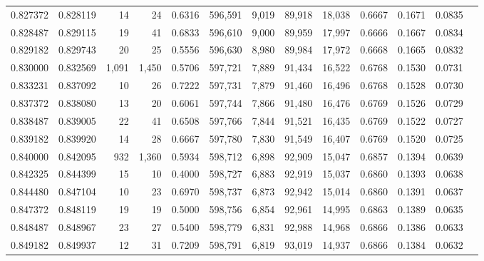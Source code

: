 \begin{tabular}{rrrrrrrrrrrrr}
0.827372 & 0.828119 &     14 &    24 &                                     0.6316 & 596,591 &   9,019 &  89,918 &  18,038 & 0.6667 & 0.1671 & 0.0835 \\
0.828487 & 0.829115 &     19 &    41 &                                     0.6833 & 596,610 &   9,000 &  89,959 &  17,997 & 0.6666 & 0.1667 & 0.0834 \\
0.829182 & 0.829743 &     20 &    25 &                                     0.5556 & 596,630 &   8,980 &  89,984 &  17,972 & 0.6668 & 0.1665 & 0.0832 \\
0.830000 & 0.832569 &  1,091 & 1,450 &                                     0.5706 & 597,721 &   7,889 &  91,434 &  16,522 & 0.6768 & 0.1530 & 0.0731 \\
0.833231 & 0.837092 &     10 &    26 &                                     0.7222 & 597,731 &   7,879 &  91,460 &  16,496 & 0.6768 & 0.1528 & 0.0730 \\
0.837372 & 0.838080 &     13 &    20 &                                     0.6061 & 597,744 &   7,866 &  91,480 &  16,476 & 0.6769 & 0.1526 & 0.0729 \\
0.838487 & 0.839005 &     22 &    41 &                                     0.6508 & 597,766 &   7,844 &  91,521 &  16,435 & 0.6769 & 0.1522 & 0.0727 \\
0.839182 & 0.839920 &     14 &    28 &                                     0.6667 & 597,780 &   7,830 &  91,549 &  16,407 & 0.6769 & 0.1520 & 0.0725 \\
0.840000 & 0.842095 &    932 & 1,360 &                                     0.5934 & 598,712 &   6,898 &  92,909 &  15,047 & 0.6857 & 0.1394 & 0.0639 \\
0.842325 & 0.844399 &     15 &    10 &                                     0.4000 & 598,727 &   6,883 &  92,919 &  15,037 & 0.6860 & 0.1393 & 0.0638 \\
0.844480 & 0.847104 &     10 &    23 &                                     0.6970 & 598,737 &   6,873 &  92,942 &  15,014 & 0.6860 & 0.1391 & 0.0637 \\
0.847372 & 0.848119 &     19 &    19 &                                     0.5000 & 598,756 &   6,854 &  92,961 &  14,995 & 0.6863 & 0.1389 & 0.0635 \\
0.848487 & 0.848967 &     23 &    27 &                                     0.5400 & 598,779 &   6,831 &  92,988 &  14,968 & 0.6866 & 0.1386 & 0.0633 \\
0.849182 & 0.849937 &     12 &    31 &                                     0.7209 & 598,791 &   6,819 &  93,019 &  14,937 & 0.6866 & 0.1384 & 0.0632 \\

\end{tabular}
